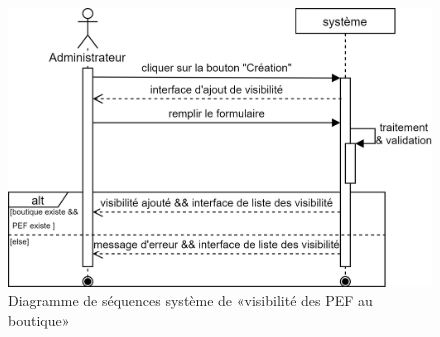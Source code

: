	\begin{figure}[H]
		\centering
		\includegraphics[width=0.7\linewidth]{"img/conception/sequences/sprint 3/visibilite-system"}
		\caption[Diagramme de séquences système de «visibilité des PEF au boutique»]{Diagramme de séquences système de «visibilité des PEF au boutique»}
		\label{fig:visibilite-system}
	\end{figure}


